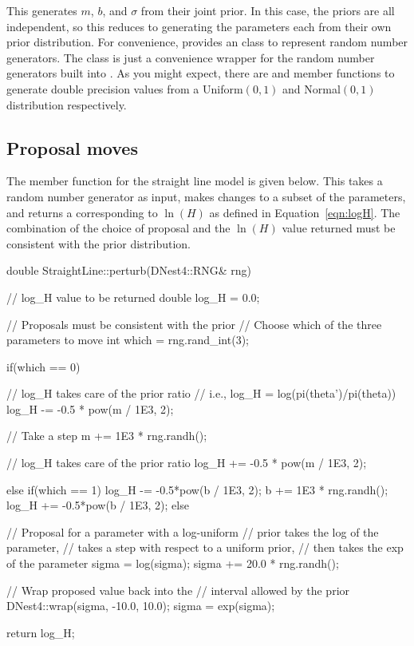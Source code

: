 \documentclass[article, nojss]{jss}
\begin{document}
This generates $m$, $b$, and $\sigma$ from their joint prior. In this case,
the priors are all independent, so this reduces to generating the parameters
each from their own prior distribution. For convenience,
 provides an  class to represent random number
generators. The  class is just a convenience wrapper for the
random number generators built into .
As you might expect, there are
 and  member functions to generate
double precision values
from a Uniform$(0,1)$ and Normal$(0,1)$ distribution respectively.

\subsection{Proposal moves}\label{sec:perturb}
The  member function for the straight line model is given below.
This takes a random number generator as input, makes changes to
a subset of the parameters, and returns a  corresponding
to $\ln(H)$ as defined in Equation~\ref{eqn:logH}. The combination of
the choice of proposal and the $\ln(H)$ value returned must be consistent
with the prior distribution.
\begin{CodeChunk}
\begin{CodeInput}
double StraightLine::perturb(DNest4::RNG& rng)
{
    // log_H value to be returned
    double log_H = 0.0;

    // Proposals must be consistent with the prior
    // Choose which of the three parameters to move
    int which = rng.rand_int(3);

    if(which == 0)
    {
        // log_H takes care of the prior ratio
        // i.e., log_H = log(pi(theta')/pi(theta))
        log_H -= -0.5 * pow(m / 1E3, 2);

        // Take a step
        m += 1E3 * rng.randh();

        // log_H takes care of the prior ratio
        log_H += -0.5 * pow(m / 1E3, 2);
    }
    else if(which == 1)
    {
        log_H -= -0.5*pow(b / 1E3, 2);
        b += 1E3 * rng.randh();
        log_H += -0.5*pow(b / 1E3, 2);
    }
    else
    {
        // Proposal for a parameter with a log-uniform
        // prior takes the log of the parameter,
        // takes a step with respect to a uniform prior,
        // then takes the exp of the parameter
        sigma = log(sigma);
        sigma += 20.0 * rng.randh();

        // Wrap proposed value back into the
        // interval allowed by the prior
        DNest4::wrap(sigma, -10.0, 10.0);
        sigma = exp(sigma);
    }

    return log_H;
}
\end{CodeInput}
\end{CodeChunk}
\end{document}
